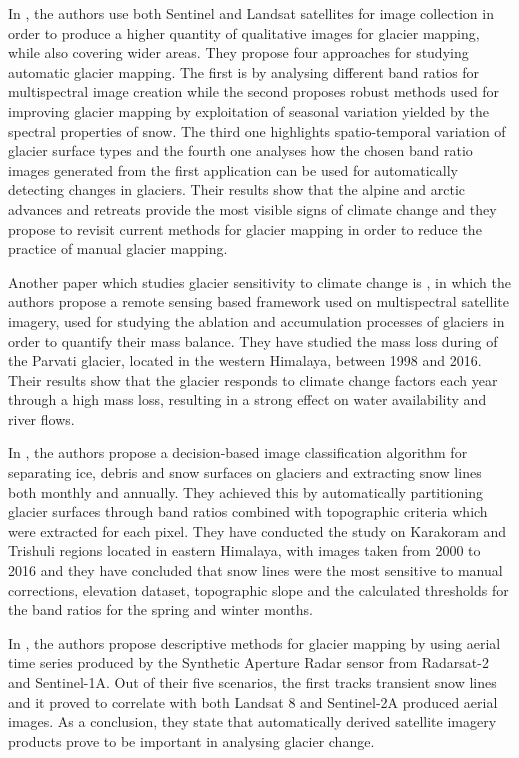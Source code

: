 \documentclass[12pt, a4paper]{report}
\begin{document}
	\par In \cite{WINSVOLD2016}, the authors use both Sentinel and Landsat satellites for image collection in order to produce a higher quantity of qualitative images for glacier mapping, while also covering wider areas. They propose four approaches for studying automatic glacier mapping. The first is by analysing different band ratios for multispectral image creation while the second proposes robust methods used for improving glacier mapping by exploitation of seasonal variation yielded by the spectral properties of snow. The third one highlights spatio-temporal variation of glacier surface types and the fourth one analyses how the chosen band ratio images generated from the first application can be used for automatically detecting changes in glaciers. Their results show that the alpine and arctic advances and retreats provide the most visible signs of climate change and they propose to revisit current methods for glacier mapping in order to reduce the practice of manual glacier mapping.
	
	\par Another paper which studies glacier sensitivity to climate change is \cite{TAK2020}, in which the authors propose a remote sensing based framework used on multispectral satellite imagery, used for studying the ablation and accumulation processes of glaciers in order to quantify their mass balance. They have studied the mass loss during of the Parvati glacier, located in the western Himalaya, between 1998 and 2016. Their results show that the glacier responds to climate change factors each year through a high mass loss, resulting in a strong effect on water availability and river flows.
	
	\par In \cite{RACOVITEANU2019}, the authors propose a decision-based image classification algorithm for separating ice, debris and snow surfaces on glaciers and extracting snow lines both monthly and annually. They achieved this by automatically partitioning glacier surfaces through band ratios combined with topographic criteria which were extracted for each pixel. They have conducted the study on Karakoram and Trishuli regions located in eastern Himalaya, with images taken from 2000 to 2016 and they have concluded that snow lines were the most sensitive to manual corrections, elevation dataset, topographic slope and the calculated thresholds for the band ratios for the spring and winter months.
	
	\par In \cite{WINSVOLD2017}, the authors propose descriptive methods for glacier mapping by using aerial time series produced by the Synthetic Aperture Radar sensor from Radarsat-2 and Sentinel-1A. Out of their five scenarios, the first tracks transient snow lines and it proved to correlate with both Landsat 8 and Sentinel-2A produced aerial images. As a conclusion, they state that automatically derived satellite imagery products prove to be important in analysing glacier change.
	
\end{document}
